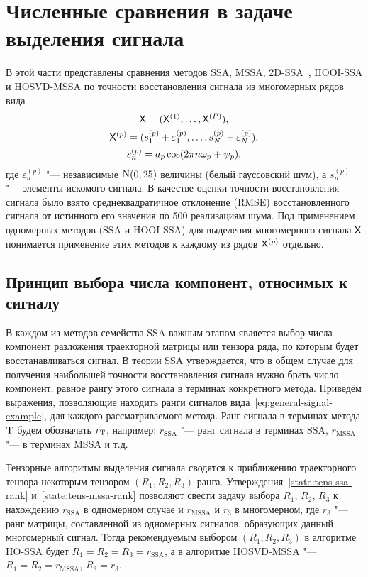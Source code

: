 \documentclass[specialist,
    substylefile = spbu_report.rtx,
    subf,href,colorlinks=true, 12pt]{disser}
\theoremstyle{plain}
\theoremstyle{definition}
\theoremstyle{remark}
\begin{document}
    \section{Численные сравнения в задаче выделения сигнала}\label{sec:numerical-compar}
    В этой части представлены сравнения методов SSA, MSSA, 2D-SSA~\cite{ssa-2020}, HOOI-SSA и HOSVD-MSSA
    по точности восстановления сигнала из многомерных рядов вида
    \begin{gather}
        \mathsf{X} = (\mathsf{X}^{(1)}, \ldots, \mathsf{X}^{(P)}), \nonumber \\
        \mathsf{X}^{(p)} = (s_1^{(p)} + \varepsilon_1^{(p)}, \ldots, s_N^{(p)} + \varepsilon_N^{(p)}),\nonumber \\
        s_n^{(p)} = a_p \cos(2\pi n \omega_p + \psi_p), \label{eq:general-signal-example}
    \end{gather}
    где $\varepsilon_n^{(p)}$ "--- независимые $\mathrm{N}(0, 25)$ величины (белый гауссовский шум), а
    $s_n^{(p)}$ "--- элементы искомого сигнала.
    В качестве оценки точности восстановления сигнала было взято среднеквадратичное отклонение (RMSE)
    восстановленного сигнала от истинного его значения по 500 реализациям шума.
    Под применением одномерных методов (SSA и HOOI-SSA) для выделения многомерного сигнала $\mathsf{X}$ понимается
    применение этих методов к каждому из рядов $\mathsf{X}^{(p)}$ отдельно.

    \subsection{Принцип выбора числа компонент, относимых к сигналу}\label{subsec:example-signal-ranks}
    В каждом из методов семейства SSA важным этапом является выбор числа компонент разложения траекторной матрицы
    или тензора ряда, по которым будет восстанавливаться сигнал.
    В теории SSA утверждается, что в общем случае для получения наибольшей точности восстановления
    сигнала нужно брать число компонент, равное рангу этого сигнала в терминах конкретного метода.
    Приведём выражения, позволяющие находить ранги сигналов вида~\eqref{eq:general-signal-example}, для каждого
    рассматриваемого метода.
    Ранг сигнала в терминах метода $\mathrm{T}$ будем обозначать $r_{\mathrm{T}}$, например: $r_\text{SSA}$ "---
    ранг сигнала в терминах SSA, $r_\text{MSSA}$ "--- в терминах MSSA и т.д.

    Тензорные алгоритмы выделения сигнала сводятся к приближению траекторного тензора некоторым
    тензором $(R_1, R_2, R_3)$-ранга.
    Утверждения~\ref{state:tens-ssa-rank} и~\ref{state:tens-mssa-rank} позволяют свести задачу выбора $R_1$,
    $R_2$, $R_3$ к нахождению $r_{\text{SSA}}$ в одномерном случае и $r_\text{MSSA}$ и $r_3$ в многомерном,
    где $r_3$ "--- ранг матрицы, составленной из одномерных сигналов, образующих данный многомерный сигнал.
    Тогда рекомендуемым выбором $(R_1, R_2, R_3)$ в алгоритме HO-SSA будет $R_1=R_2=R_3=r_\text{SSA}$, а
    в алгоритме HOSVD-MSSA "--- $R_1=R_2=r_\text{MSSA}$, $R_3 = r_3$.
\end{document}
